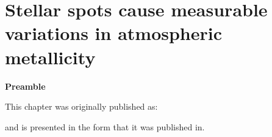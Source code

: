 
\chapter{Stellar spots cause measurable variations in atmospheric metallicity}
\label{chap:stellar_spots}

\textbf{Preamble}

This chapter was originally published as:
\begin{quote}
	\citet{tanner_ss}
\end{quote}
and is presented in the form that it was published in.

\newpage


